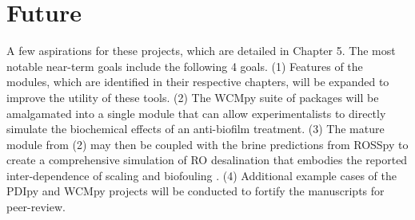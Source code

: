 \section{Future}
A few aspirations for these projects, which are detailed in Chapter 5. The most notable near-term goals include the following 4 goals. (1) Features of the modules, which are identified in their respective chapters, will be expanded to improve the utility of these tools. (2) The WCMpy suite of packages will be amalgamated into a single module that can allow experimentalists to directly simulate the biochemical effects of an anti-biofilm treatment. (3) The mature module from (2) may then be coupled with the brine predictions from ROSSpy to create a comprehensive simulation of RO desalination that embodies the reported inter-dependence of scaling and biofouling \cite{Radu2014ASystems,Radu2010ModelingPassage}. (4) Additional example cases of the PDIpy and WCMpy projects will be conducted to fortify the manuscripts for peer-review.